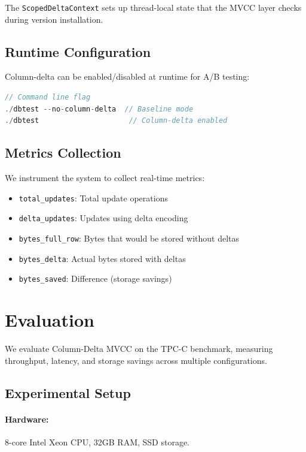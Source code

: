 \documentclass[letterpaper,twocolumn,10pt]{article}
\begin{document}
The \texttt{ScopedDeltaContext} sets up thread-local state that the MVCC layer checks during version installation.

\subsection{Runtime Configuration}

Column-delta can be enabled/disabled at runtime for A/B testing:

\begin{lstlisting}[language=C++,basicstyle=\small\ttfamily]
// Command line flag
./dbtest --no-column-delta  // Baseline mode
./dbtest                     // Column-delta enabled
\end{lstlisting}

\subsection{Metrics Collection}

We instrument the system to collect real-time metrics:

\begin{itemize}
\item \texttt{total\_updates}: Total update operations
\item \texttt{delta\_updates}: Updates using delta encoding
\item \texttt{bytes\_full\_row}: Bytes that would be stored without deltas
\item \texttt{bytes\_delta}: Actual bytes stored with deltas
\item \texttt{bytes\_saved}: Difference (storage savings)
\end{itemize}

\section{Evaluation}
\label{sec:evaluation}

We evaluate Column-Delta MVCC on the TPC-C benchmark, measuring throughput, latency, and storage savings across multiple configurations.

\subsection{Experimental Setup}

\paragraph{Hardware:} 8-core Intel Xeon CPU, 32GB RAM, SSD storage.
\end{document}
